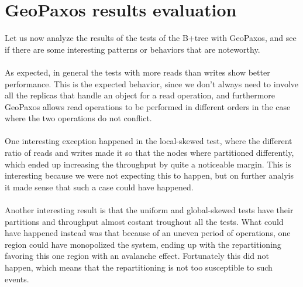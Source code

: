 \section{GeoPaxos results evaluation}\label{sec:geopaxos-results-evaluation}
Let us now analyze the results of the tests of the B+tree with GeoPaxos, and see if there are some interesting patterns or behaviors that are noteworthy.
\\\\
As expected, in general the tests with more reads than writes show better performance. This is the expected behavior, since we don't always need to involve all the replicas that handle an object for a read operation, and furthermore GeoPaxos allows read operations to be performed in different orders in the case where the two operations do not conflict.
\\\\
One interesting exception happened in the local-skewed test, where the different ratio of reads and writes made it so that the nodes where partitioned differently, which ended up increasing the throughput by quite a noticeable margin. This is interesting because we were not expecting this to happen, but on further analyis it made sense that such a case could have happened.
\\\\
Another interesting result is that the uniform and global-skewed tests have their partitions and throughput almost costant troughout all the tests. What could have happened instead was that because of an uneven period of operations, one region could have monopolized the system, ending up with the repartitioning favoring this one region with an avalanche effect. Fortunately this did not happen, which means that the repartitioning is not too susceptible to such events.
\\\\
